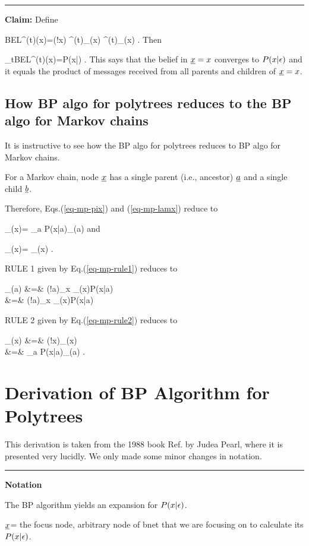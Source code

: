 \hrule\noindent
{\bf Claim:} Define

\beq
BEL^{(t)}(x)=\caln(!x)
\lam^{(t)}_\rvx(x)
\pi^{(t)}_\rvx(x)
\;.\eeq
Then

\beq
\lim_{t\rarrow \infty}BEL^{(t)}(x)=P(x|\eps)
\;.
\eeq
This  says that
the belief in $\rvx=x$
converges to $P(x|\epsilon)$ and it
equals the product
of messages received from all
parents and children of $\rvx=x$.

\subsection{How BP algo
for polytrees reduces to the 
BP algo for Markov chains}

It is instructive
to see
how the
BP algo
for polytrees reduces to 
BP algo for Markov chains.

For a Markov chain, node
$\rvx$ has a single parent (i.e., ancestor) $\rva$
and a single child $\rvb$.

Therefore, 
Eqs.(\ref{eq-mp-pix}) and (\ref{eq-mp-lamx}) reduce to

\beq
\pi_\rvx(x)=
\sum_a
P(x|a)\pi_{\rvx\ldart\rva}(a)
\eeq
and

\beq
\lam_\rvx(x)=
\lam_{\rvb\rdart \rvx}(x)
\;.
\eeq

RULE 1 given by Eq.(\ref{eq-mp-rule1}) reduces to

\beqa
\lam_{\rvx\rdart \rva}(a)
&=&
\caln(!a)\sum_x
\lam_\rvx(x)P(x|a) 
\\
&=&
\caln(!a)\sum_x
\lam_{\rvb\rdart \rvx}(x)P(x|a) 
\eeqa

RULE 2 given by Eq.(\ref{eq-mp-rule2}) reduces to

\beqa
\pi_{\rvb\ldart \rvx}(x)
&=&
\caln(!x)\pi_\rvx(x)
\\
&=&
\sum_a
P(x|a)\pi_{\rvx\ldart\rva}(a)
\;.
\eeqa



\section{Derivation of BP Algorithm
for Polytrees}

This derivation is taken from
 the 1988 book Ref.\cite{pearl-1988book}
by Judea Pearl, where it
is presented very lucidly. We only
made some minor
changes in notation.

\hrule\noindent
 {\bf Notation}

The BP algorithm yields an expansion
 for $P(x|\epsilon)$.

$\rvx$= the focus node,
arbitrary node of bnet that we are
focusing on to calculate its $P(x|\epsilon)$.



